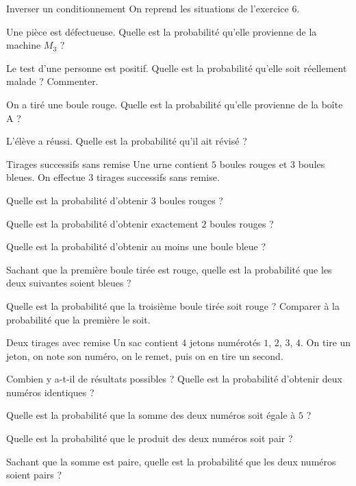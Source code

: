 \begin{exercice}[2]{Inverser un conditionnement}
On reprend les situations de l'exercice 6.
\begin{questions}
  \item Une pièce est défectueuse. Quelle est la probabilité qu'elle provienne de la machine $M_3$ ?
  \item Le test d'une personne est positif. Quelle est la probabilité qu'elle soit réellement malade ? Commenter.
  \item On a tiré une boule rouge. Quelle est la probabilité qu'elle provienne de la boîte A ?
  \item L'élève a réussi. Quelle est la probabilité qu'il ait révisé ?
\end{questions}
\end{exercice}


\begin{exercice}[3]{Tirages successifs sans remise}
Une urne contient $5$ boules rouges et $3$ boules bleues. On effectue $3$ tirages successifs sans remise.
\begin{questions}
  \item Quelle est la probabilité d'obtenir $3$ boules rouges ?
  \item Quelle est la probabilité d'obtenir exactement $2$ boules rouges ?
  \item Quelle est la probabilité d'obtenir au moins une boule bleue ?
  \item Sachant que la première boule tirée est rouge, quelle est la probabilité que les deux suivantes soient bleues ?
  \item Quelle est la probabilité que la troisième boule tirée soit rouge ? Comparer à la probabilité que la première le soit.
\end{questions}
\end{exercice}

\begin{exercice}[2]{Deux tirages avec remise}
Un sac contient $4$ jetons numérotés $1$, $2$, $3$, $4$. On tire un jeton, on note son numéro, on le remet, puis on en tire un second.
\begin{questions}
  \item Combien y a-t-il de résultats possibles ? Quelle est la probabilité d'obtenir deux numéros identiques ?
  \item Quelle est la probabilité que la somme des deux numéros soit égale à $5$ ?
  \item Quelle est la probabilité que le produit des deux numéros soit pair ?
  \item Sachant que la somme est paire, quelle est la probabilité que les deux numéros soient pairs ?
\end{questions}
\end{exercice}

